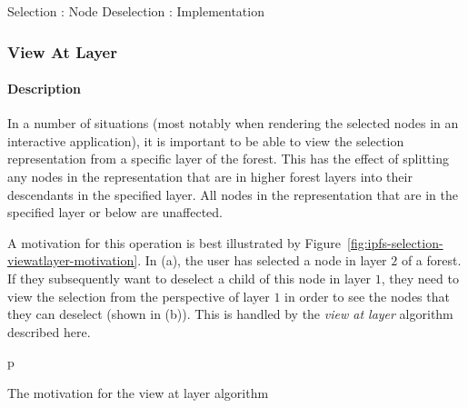 \begin{stulisting}[p]
\caption{Selection : Node Deselection : Implementation}
\label{code:ipfs-selection-deselectnodeimpl}

\end{stulisting}

\afterpage{\clearpage}
\newpage

\subsubsection{View At Layer}

\paragraph{Description}

In a number of situations (most notably when rendering the selected nodes in an interactive application), it is important to be able to view the selection representation from a specific layer of the forest. This has the effect of splitting any nodes in the representation that are in higher forest layers into their descendants in the specified layer. All nodes in the representation that are in the specified layer or below are unaffected.

A motivation for this operation is best illustrated by Figure~\ref{fig:ipfs-selection-viewatlayer-motivation}. In (a), the user has selected a node in layer $2$ of a forest. If they subsequently want to deselect a child of this node in layer $1$, they need to view the selection from the perspective of layer $1$ in order to see the nodes that they can deselect (shown in (b)). This is handled by the \emph{view at layer} algorithm described here.

\begin{stusubfig}{p}
	\hspace{4mm}%
\caption{The motivation for the view at layer algorithm}
\label{fig:ipfs-selection-viewatlayer-motivation}
\end{stusubfig}

